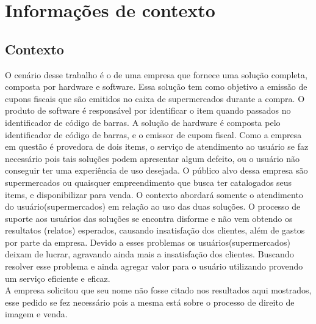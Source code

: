 \section{Informações de contexto}

\subsection{Contexto}
	O cenário desse trabalho é o de uma empresa que
	fornece uma solução completa, composta por hardware e software.
	Essa solução tem como objetivo a emissão de cupons fiscais que são emitidos no
	caixa de supermercados durante a compra.
	O produto de software é responsável por identificar o item quando passados no
	identificador de código de barras. A solução de hardware é composta pelo identificador
	de código de barras, e o emissor de cupom fiscal. Como a empresa em questão é
	provedora de dois items, o serviço de atendimento ao
	usuário se faz necessário pois tais soluções podem apresentar algum defeito, ou
	o usuário não conseguir ter uma experiência de uso desejada.
	O público alvo dessa empresa são supermercados ou quaisquer empreendimento
	que busca ter catalogados seus items, e disponibilizar para venda. O contexto
	abordará somente o atendimento do usuário(supermercados) em relação ao uso das duas soluções.
	O processo de suporte aos usuários das soluções se encontra disforme e não vem obtendo
	os resultatos (relatos) esperados, causando insatisfação dos clientes, além de gastos por parte da empresa.
	Devido a esses problemas os usuários(supermercados) deixam de lucrar, agravando ainda mais a insatisfação
	dos clientes. Buscando resolver esse problema e ainda agregar valor para o usuário utilizando provendo
	um serviço eficiente e eficaz.
	\\A empresa solicitou que seu nome não fosse citado nos resultados aqui mostrados, esse pedido
	se fez necessário pois a mesma está sobre o processo de direito de imagem e venda.
